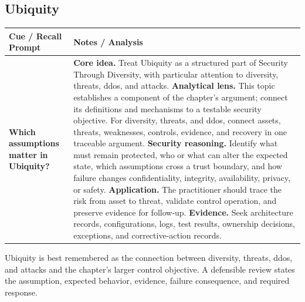 \documentclass[11pt]{article}
\newcommand{\CornellHeader}{%
\rowcolor{Navy}\color{white}\bfseries Cue / Recall Prompt & \color{white}\bfseries Notes / Analysis\\\hline}
\newcommand{\CornellRow}[2]{%
\cellcolor{CueGray}\RaggedRight\textbf{#1} & \RaggedRight #2\\\hline}
\begin{document}
\subsection*{Ubiquity}
\begin{longtable}{>{\RaggedRight\arraybackslash}p{}|>{\RaggedRight\arraybackslash}p{}}
\CornellHeader
\CornellRow{Which assumptions matter in Ubiquity?}{\textbf{Core idea.} Treat Ubiquity as a structured part of Security Through Diversity, with particular attention to diversity, threats, ddos, and attacks. \textbf{Analytical lens.} This topic establishes a component of the chapter's argument; connect its definitions and mechanisms to a testable security objective. For diversity, threats, and ddos, connect assets, threats, weaknesses, controls, evidence, and recovery in one traceable argument. \textbf{Security reasoning.} Identify what must remain protected, who or what can alter the expected state, which assumptions cross a trust boundary, and how failure changes confidentiality, integrity, availability, privacy, or safety. \textbf{Application.} The practitioner should trace the risk from asset to threat, validate control operation, and preserve evidence for follow-up. \textbf{Evidence.} Seek architecture records, configurations, logs, test results, ownership decisions, exceptions, and corrective-action records.}
\end{longtable}
\begin{topicsummary}
Ubiquity is best remembered as the connection between diversity, threats, ddos, and attacks and the chapter's larger control objective. A defensible review states the assumption, expected behavior, evidence, failure consequence, and required response.
\end{topicsummary}
\end{document}
